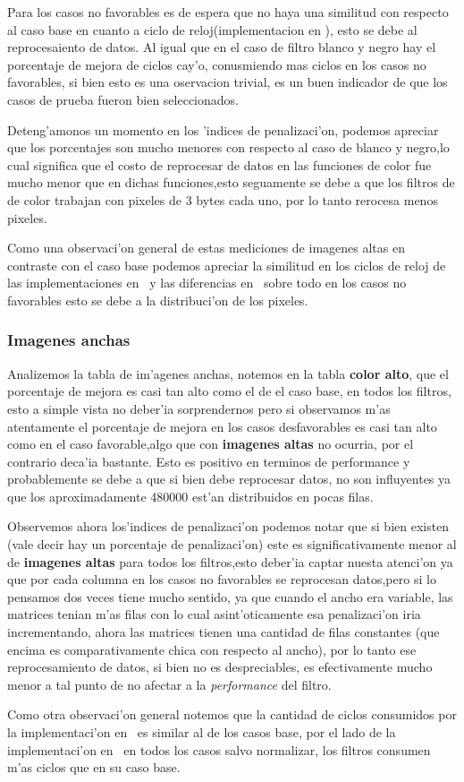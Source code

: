 Para los casos no favorables es de espera que no haya una similitud con respecto al caso base en cuanto a ciclo de 
reloj(implementacion en \ass ), esto se debe al reprocesaiento de datos. Al igual que en el caso de filtro blanco y negro
hay el porcentaje de mejora de ciclos cay'o, conusmiendo mas ciclos en los casos no favorables, si bien esto es una 
oservacion trivial, es un buen indicador de que los casos de prueba fueron bien seleccionados.

Deteng'amonos un momento en los 'indices de penalizaci'on, podemos apreciar que los porcentajes son mucho 
menores con respecto al caso de blanco y negro,lo cual significa que el costo de reprocesar de datos en
las funciones de color fue mucho menor que en dichas funciones,esto seguamente se debe a que los filtros de de color
trabajan con pixeles de 3 bytes cada uno, por lo tanto rerocesa menos pixeles.

Como una observaci'on general de estas mediciones de imagenes altas en contraste con el caso base podemos apreciar la 
similitud en los ciclos de reloj de las implementaciones en \C \ y las diferencias en \ass \ sobre todo en los 
casos no favorables esto se debe a la distribuci'on de los pixeles.

\subsubsection{Imagenes anchas}
Analizemos la tabla de im'agenes anchas, notemos en la tabla \textbf{color alto}, que el porcentaje de mejora es
casi tan alto como el de el caso base, en todos los filtros, esto a simple vista no deber'ia
 sorprendernos pero si observamos m'as atentamente el porcentaje de mejora en los casos desfavorables es 
casi tan alto como en el caso favorable,algo que con \textbf{imagenes altas} no ocurria, por el contrario
deca'ia bastante. Esto es positivo en terminos de performance y probablemente se debe a que si bien
debe reprocesar datos, no son influyentes ya que los aproximadamente 480000 est'an distribuidos en
pocas filas.

Observemos ahora los'indices de penalizaci'on podemos notar que si bien existen (vale decir hay un porcentaje
 de penalizaci'on) este es significativamente menor al de \textbf{imagenes altas} para todos los filtros,esto
deber'ia captar nuesta atenci'on ya que por cada columna en los casos no favorables se reprocesan datos,pero
si lo pensamos dos veces tiene mucho sentido, ya que cuando el ancho era variable, las matrices
tenian m'as filas con lo cual asint'oticamente esa penalizaci'on iria incrementando, ahora las matrices
tienen una cantidad de filas constantes (que encima es comparativamente chica con respecto al ancho),
por lo tanto ese reprocesamiento de datos, si bien no es despreciables, es efectivamente mucho menor
a tal punto de no afectar a la \textit{performance} del filtro.

Como otra observaci'on general notemos que la cantidad de ciclos consumidos por la implementaci'on en \C \ es
similar al de los casos base, por el lado de la implementaci'on en \ass \ en todos los casos salvo normalizar,
los filtros consumen m'as ciclos que en su caso base.




